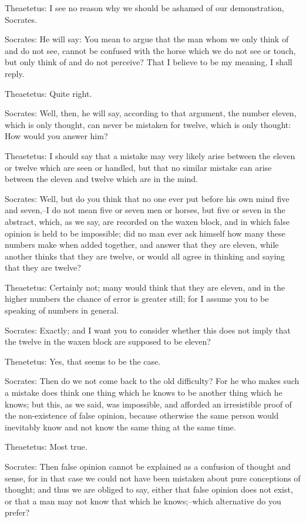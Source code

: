 Theaetetus: I see no reason why we should be ashamed of our
demonstration, Socrates.

Socrates: He will say: You mean to argue that the man whom we only think
of and do not see, cannot be confused with the horse which we do not see
or touch, but only think of and do not perceive? That I believe to be my
meaning, I shall reply.

Theaetetus: Quite right.

Socrates: Well, then, he will say, according to that argument, the
number eleven, which is only thought, can never be mistaken for twelve,
which is only thought: How would you answer him?

Theaetetus: I should say that a mistake may very likely arise between
the eleven or twelve which are seen or handled, but that no similar
mistake can arise between the eleven and twelve which are in the mind.

Socrates: Well, but do you think that no one ever put before his own
mind five and seven,--I do not mean five or seven men or horses, but
five or seven in the abstract, which, as we say, are recorded on the
waxen block, and in which false opinion is held to be impossible; did
no man ever ask himself how many these numbers make when added together,
and answer that they are eleven, while another thinks that they are
twelve, or would all agree in thinking and saying that they are twelve?

Theaetetus: Certainly not; many would think that they are eleven, and
in the higher numbers the chance of error is greater still; for I assume
you to be speaking of numbers in general.

Socrates: Exactly; and I want you to consider whether this does not
imply that the twelve in the waxen block are supposed to be eleven?

Theaetetus: Yes, that seems to be the case.

Socrates: Then do we not come back to the old difficulty? For he who
makes such a mistake does think one thing which he knows to be another
thing which he knows; but this, as we said, was impossible, and afforded
an irresistible proof of the non-existence of false opinion, because
otherwise the same person would inevitably know and not know the same
thing at the same time.

Theaetetus: Most true.

Socrates: Then false opinion cannot be explained as a confusion of
thought and sense, for in that case we could not have been mistaken
about pure conceptions of thought; and thus we are obliged to say,
either that false opinion does not exist, or that a man may not know
that which he knows;--which alternative do you prefer?

